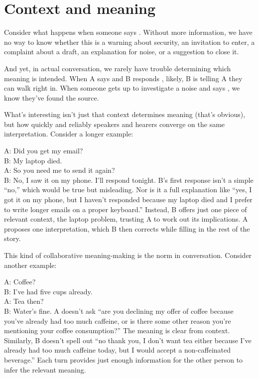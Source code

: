 \section{Context and meaning}

Consider what happens when someone says . Without more information, we have no way to know whether this is a warning about security, an invitation to enter, a complaint about a draft, an explanation for noise, or a suggestion to close it.

And yet, in actual conversation, we rarely have trouble determining which meaning is intended. When A says  and B responds , likely, B is telling A they can walk right in. When someone gets up to investigate a noise and says , we know they've found the source.

What's interesting isn't just that context determines meaning (that's obvious), but how quickly and reliably speakers and hearers converge on the same interpretation. Consider a longer example:

\ea
   A: Did you get my email?\\
   B: My laptop died.\\
   A: So you need me to send it again?\\
   B: No, I saw it on my phone. I'll respond tonight.
\z
B's first response isn't a simple \enquote{no,} which would be true but misleading. Nor is it a full explanation like \enquote{yes, I got it on my phone, but I haven't responded because my laptop died and I prefer to write longer emails on a proper keyboard.} Instead, B offers just one piece of relevant context, the laptop problem, trusting A to work out its implications. A proposes one interpretation, which B then corrects while filling in the rest of the story.

This kind of collaborative meaning-making is the norm in conversation. Consider another example:

\ea
   A: Coffee?\\
   B: I've had five cups already.\\
   A: Tea then?\\
   B: Water's fine.
\z
A doesn't ask \enquote{are you declining my offer of coffee because you've already had too much caffeine, or is there some other reason you're mentioning your coffee consumption?} The meaning is clear from context. Similarly, B doesn't spell out \enquote{no thank you, I don't want tea either because I've already had too much caffeine today, but I would accept a non-caffeinated beverage.} Each turn provides just enough information for the other person to infer the relevant meaning.

